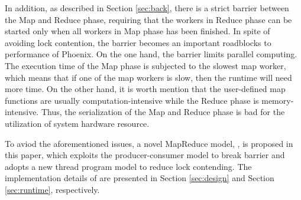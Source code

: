 In addition, as described in Section \ref{sec:back}, there is a strict barrier between the Map and Reduce phase, requiring that the workers in Reduce phase can be started only when all workers in Map phase has been finished.
In spite of avoiding lock contention, the barrier becomes an important roadblocks to  performance of Phoenix. 
On the one hand, the barrier limits parallel computing.
The execution time of the Map phase is subjected to the slowest map worker, which means that if one of the map workers is slow, then the runtime will need more time.
On the other hand, it is worth mention that the user-defined map functions are usually computation-intensive while the Reduce phase is memory-intensive. Thus, the serialization of the Map and Reduce phase is bad for the utilization of system hardware resource.






To aviod the aforementioned issues, a novel MapReduce model, \myds,  is proposed in this paper,
which exploits the producer-consumer model to break barrier and adopts a new thread program model to reduce lock contending.
The implementation details of \myds are presented in Section \ref{sec:design} and Section \ref{sec:runtime}, respectively.  








